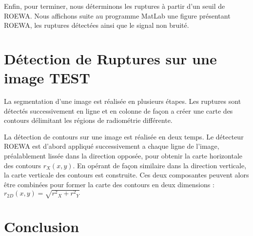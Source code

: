 \documentclass[a4paper,11pt]{article}
\newcommand{\FSource}[1]{%
  
  }
\begin{document}
\FSource{matlab/7.m}

\vspace{0.5cm}

Enfin, pour terminer, nous déterminons les ruptures à partir d'un seuil de ROEWA. Nous affichons suite au programme MatLab une figure présentant ROEWA, les ruptures détectées ainsi que le signal non bruité.

\vspace{0.5cm}

\FSource{matlab/8.m}

\vspace{0.5cm}


\newpage

\section{Détection de Ruptures sur une image TEST}

La segmentation d'une image est réalisée en plusieurs étapes. Les ruptures sont détectés
successivement en ligne et en colonne de façon a créer une carte des contours délimitant
les régions de radiométrie différente.

La détection de contours sur une image est réalisée en deux temps. Le détecteur
ROEWA est d'abord appliqué successivement a chaque ligne de l'image, préalablement
lissée dans la direction opposée, pour obtenir la carte horizontale des contours $r_X (x, y)$.
En opérant de façon similaire dans la direction verticale, la carte verticale des contours
est construite. Ces deux composantes peuvent alors être combinées pour former la carte
des contours en deux dimensions : $r_{2D}(x,y)=\sqrt{{r^2}_X+{r^2}_Y}$


\newpage

\section{Conclusion}
\end{document}
